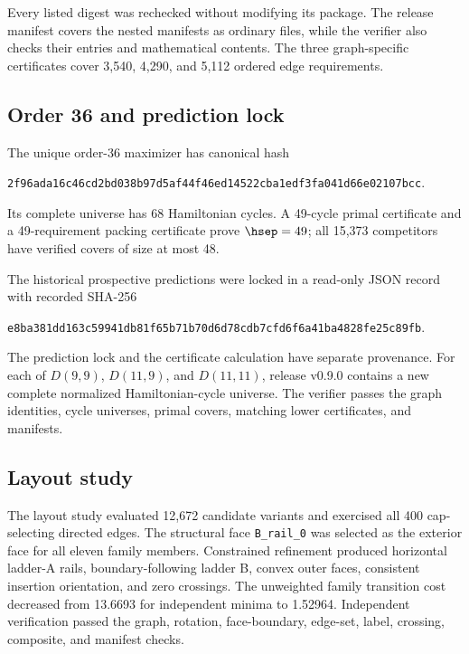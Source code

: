Every listed digest was rechecked without modifying its package.  The release
manifest covers the nested manifests as ordinary files, while the verifier also
checks their entries and mathematical contents.  The three graph-specific
certificates cover 3,540, 4,290, and 5,112 ordered edge requirements.

\subsection*{Order 36 and prediction lock}

The unique order-36 maximizer has canonical hash
\begin{center}
\scriptsize
\nolinkurl{2f96ada16c46cd2bd038b97d5af44f46ed14522cba1edf3fa041d66e02107bcc}.
\end{center}
Its complete universe has 68 Hamiltonian cycles.  A 49-cycle primal certificate
and a 49-requirement packing certificate prove \(\hsep=49\); all 15,373
competitors have verified covers of size at most 48.

The historical prospective predictions were locked in a read-only JSON record
with recorded SHA-256
\begin{center}
\scriptsize
\nolinkurl{e8ba381dd163c59941db81f65b71b70d6d78cdb7cfd6f6a41ba4828fe25c89fb}.
\end{center}
The prediction lock and the certificate calculation have separate provenance.
For each of \(D(9,9)\), \(D(11,9)\), and \(D(11,11)\), release v0.9.0 contains a
new complete normalized Hamiltonian-cycle universe.  The verifier passes the
graph identities, cycle universes, primal covers, matching lower certificates,
and manifests.

\subsection*{Layout study}

The layout study evaluated 12,672 candidate variants and exercised all 400
cap-selecting directed edges.  The structural face \texttt{B\_rail\_0} was
selected as the exterior face for all eleven family members.  Constrained
refinement produced horizontal ladder-A rails, boundary-following ladder B,
convex outer faces, consistent insertion orientation, and zero crossings.  The
unweighted family transition cost decreased from 13.6693 for independent
minima to 1.52964.  Independent verification passed the graph, rotation,
face-boundary, edge-set, label, crossing, composite, and manifest checks.

